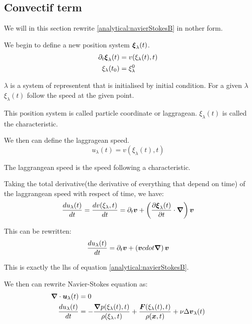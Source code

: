 \subsection{Convectif term}
We will in this section rewrite \ref{analytical:navierStokesB} in nother form.

We begin to define a new position system ${\boldsymbol \xi}_{\lambda}(t)$.
\begin{align}
 \partial_t {\boldsymbol \xi}_{\lambda}(t)&=v(\xi_{\lambda}(t),t)\\
 \xi_{\lambda}(t_0)&=\xi^{0}_{\lambda}
\end{align}

$\lambda$ is a system of representent that is initialised by initial condition.
For a given $\lambda$ $\xi_{\lambda}(t)$ follow the speed at the given point.

This position system is called particle coordinate or laggragean.
$\xi_\lambda(t)$ is called the characteristic.

We then can define the laggragean speed.
\begin{equation}
 u_{\lambda}(t)=v(\xi_{\lambda}(t),t)
\end{equation}

The laggrangean speed is the speed following a characteristic.

Taking the total derivative(the derivative of everything that depend on time) of the laggrangean speed with respect of time, we have:
\begin{equation}
\frac{d u_{\lambda}(t)}{d t}=\frac{d v(\xi_{\lambda},t)}{d t}=\partial_t {\boldsymbol v}+\left(\frac{\partial {\boldsymbol \xi_{\lambda}}(t)}{\partial t}\cdot{\boldsymbol \nabla}\right){\boldsymbol v}
\end{equation}

This can be rewritten:
\begin{equation}
\frac{d u_{\lambda}(t)}{d t}=\partial_t {\boldsymbol v}+\left({\boldsymbol v} cdot{\boldsymbol \nabla}\right){\boldsymbol v}
\end{equation}

This is exactly the lhs of equation \ref{analytical:navierStokesB}.

We then can rewrite Navier-Stokes equation as:
\begin{align}
\label{analytical:navierStokesLagA}
{\boldsymbol \nabla} \cdot {\boldsymbol u}_{\lambda}(t)&=0\\
\label{analytical:navierStokesLagB}
\frac{d u_{\lambda}(t)}{d t}&=-\frac{{\boldsymbol \nabla} p(\xi_{\lambda}(t),t)}{\rho(\xi_{\lambda},t)}+\frac{{\boldsymbol F}(\xi_{\lambda}(t),t)}{\rho({\boldsymbol x},t)}+\nu \Delta {\boldsymbol v}_{\lambda}(t)
\end{align}

